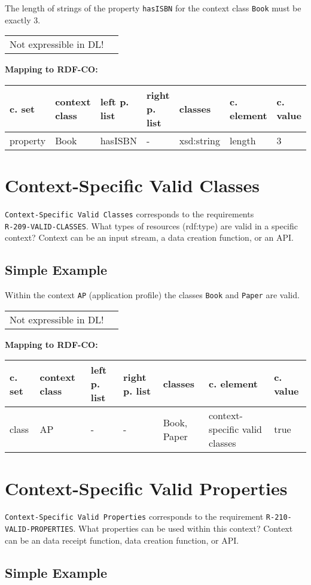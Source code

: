 \documentclass{llncs}
\newcommand{\ms}[1]{\texttt{#1}}
\newenvironment{gcotable}{
  \scriptsize
  \sffamily
  \vspace{0cm}
	\begin{center}
	\textbf{\vspace{0.4cm}Mapping to RDF-CO:} \\
  \begin{tabular}{l|l|l|l|l|l|l}
	\hline
  \textbf{c. set} & \textbf{context class} & \textbf{left p. list} & \textbf{right p. list} & \textbf{classes} & \textbf{c. element} & \textbf{c. value} \\
  \hline

}{
  \hline
  \end{tabular}
	\end{center}
}
\newenvironment{DL}{
\vspace{0cm}
	\begin{center}
  \begin{tabular}{r l}

}{
  \end{tabular}
	\end{center}
}
\begin{document}
The length of strings of the property \ms{hasISBN} for the context class \ms{Book} must be exactly 3.

\begin{DL}
Not expressible in DL!
\end{DL}

\begin{gcotable}
property & Book & hasISBN & - & xsd:string & length & 3 \\
\end{gcotable}

\section{Context-Specific Valid Classes}

\ms{Context-Specific Valid Classes} corresponds to the requirements \\
\ms{R-209-VALID-CLASSES}.
What types of resources (rdf:type) are valid in a specific context? 
Context can be an input stream, a data creation function, or an API.

\subsection{Simple Example}

Within the context \ms{AP} (application profile) the classes \ms{Book} and \ms{Paper} are valid.

\begin{DL}
Not expressible in DL!
\end{DL}

\begin{gcotable}
class & AP & - & - & Book, Paper & context-specific valid classes & true \\
\end{gcotable}

\section{Context-Specific Valid Properties}

\ms{Context-Specific Valid Properties} corresponds to the requirement
\ms{R-210-} \ms{VALID-PROPERTIES}.
What properties can be used within this context? 
Context can be an data receipt function, data creation function, or API.

\subsection{Simple Example}
\end{document}
